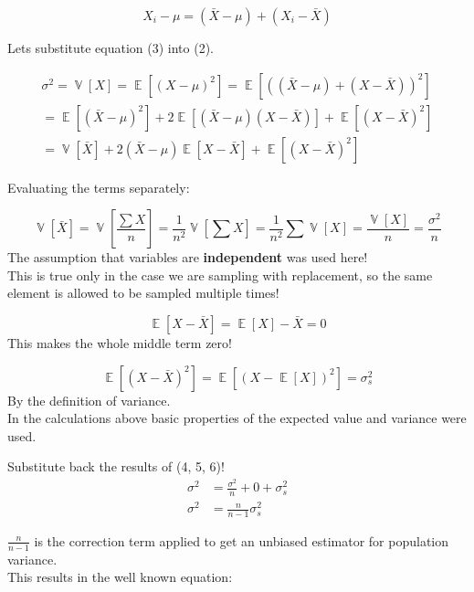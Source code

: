 \documentclass[12pt, a4paper, twoside]{article}
\DeclareMathOperator{\srexpop}{\mathbb{E}}
\DeclareMathOperator{\srexvar}{\mathbb{V}}
\newcommand\srexp[1]{\srexpop\left[#1\right]}
\newcommand\srvar[1]{\srexvar\left[#1\right]}
\begin{document}
\begin{equation}
	X_i - \mu = (\bar{X} - \mu) + (X_i - \bar{X})
\end{equation}

Lets substitute equation (3) into (2).

\begin{gather*}
	\sigma^2 = \srvar{X} = \srexp{(X - \mu)^2} = \srexp{ \left((\bar{X} - \mu) + (X - \bar{X})\right)^2} \\[1em]
	= \srexp{(\bar{X} - \mu)^2} + 2 \srexp{(\bar{X} - \mu) (X - \bar{X})} + \srexp{(X - \bar{X})^2} \\[1em]
	= \srvar{\bar{X}} + 2 (\bar{X} - \mu) \srexp{X - \bar{X}} + \srexp{(X - \bar{X})^2}
\end{gather*}

Evaluating the terms separately:

\begin{equation}
	\srvar{\bar{X}} = \srvar{\frac{\sum{X}}{n}} = \frac{1}{n^2}\srvar{\sum{X}} = \frac{1}{n^2}\sum\srvar{X} = \frac{\srvar{X}}{n} = \frac{\sigma^2}{n}
\end{equation}
The assumption that variables are \textbf{independent} was used here!\\
This is true only in the case we are sampling with replacement, so the same element is allowed to be sampled multiple times!

\begin{equation}
	\srexp{X - \bar{X}} = \srexp{X} - \bar{X} = 0
\end{equation}
This makes the whole middle term zero!

\begin{equation}
	\srexp{(X - \bar{X})^2} = \srexp{(X - \srexp{X})^2} = \sigma_s^2
\end{equation}
By the definition of variance.\\
In the calculations above basic properties of the expected value and variance were used.

Substitute back the results of (4, 5, 6)!
\begin{align*}
	\sigma^2 &= \frac{\sigma^2}{n} + 0 + \sigma_s^2 \\[1em]
	\sigma^2 &= \frac{n}{n-1} \sigma_s^2 
\end{align*}

$\frac{n}{n-1}$ is the correction term applied to get an unbiased estimator for population variance.\\[1em]
This results in the well known equation:
\end{document}
